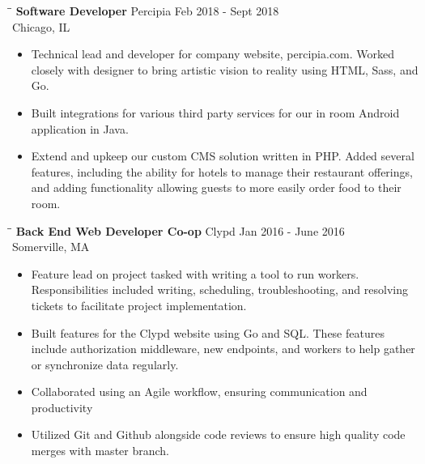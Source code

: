 \documentclass{res}
\begin{document}
\begin{resume}
\begin{itemize}[leftmargin= .1in]
\end{itemize}
\begin{tabbing}
  \hspace{2.3in}\= \hspace{2.6in}\= \kill %
  {\bf Software Developer} \>Percipia     \> Feb 2018 - Sept 2018\\
  \>Chicago, IL
\end{tabbing}
\begin{itemize}[leftmargin= .1in] \itemsep -2pt
\item Technical lead and developer for company website, percipia.com. Worked closely
  with designer to bring artistic vision to reality using HTML, Sass, and Go.
\item Built integrations for various third party services for our in room Android application in Java.
\item Extend and upkeep our custom CMS solution written in PHP. Added several features, including
  the ability for hotels to manage their restaurant offerings, and adding functionality allowing guests to
  more easily order food to their room.
\end{itemize}
\vspace{-.2in}
\begin{tabbing}
  \hspace{2.3in}\= \hspace{2.6in}\= \kill %
  {\bf Back End Web Developer Co-op} \>Clypd     \> Jan 2016 - June 2016\\
  \>Somerville, MA
\end{tabbing}
\begin{itemize}[leftmargin= .1in] \itemsep -2pt
\item Feature lead on project tasked with writing a tool to run workers. Responsibilities
  included writing, scheduling, troubleshooting, and resolving tickets to facilitate project
  implementation.
\item Built features for the Clypd website using Go and SQL. These features include
  authorization middleware, new endpoints, and workers to help gather or synchronize data
  regularly.
\item Collaborated using an Agile workflow, ensuring communication and productivity
\item Utilized Git and Github alongside code reviews to ensure high quality code merges with
  master branch.
\end{itemize}
\vspace{-.2in}
   \begin{tabbing}

\end{tabbing}
\end{resume}
\end{document}

